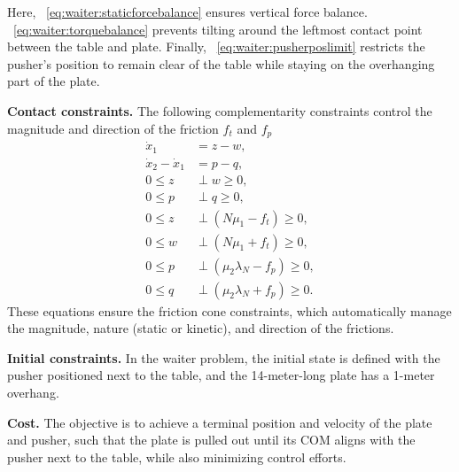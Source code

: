 Here, ~\eqref{eq:waiter:staticforcebalance} ensures vertical force balance. ~\eqref{eq:waiter:torquebalance} prevents tilting around the leftmost contact point between the table and plate. Finally, ~\eqref{eq:waiter:pusherposlimit} restricts the pusher's position to remain clear of the table while staying on the overhanging part of the plate.

\textbf{Contact constraints. }
The following complementarity constraints control the magnitude and direction of the friction $f_t$ and $f_p$ 
\begin{align}
    \dot{x}_1 &= z - w,\\
    \dot{x}_2 - \dot{x}_1 &= p - q,\\
    0\leq z &\perp w \geq 0,\\    
    0\leq p &\perp q \geq 0,\\
    0\leq z &\perp (N\mu_1 - f_t) \geq 0,\\
    0\leq w &\perp (N\mu_1 + f_t) \geq 0,\\
    0\leq p &\perp (\mu_2\lambda_N - f_p) \geq 0,\\
    0\leq q &\perp (\mu_2\lambda_N +f_p) \geq 0.
\end{align}
These equations ensure the friction cone constraints, which automatically manage the magnitude, nature (static or kinetic), and direction of the frictions.

\textbf{Initial constraints.}
In the waiter problem, the initial state is defined with the pusher positioned next to the table, and the 14-meter-long plate has a 1-meter overhang.

\textbf{Cost. }
The objective is to achieve a terminal position and velocity of the plate and pusher, such that the plate is pulled out until its COM aligns with the pusher next to the table, while also minimizing control efforts.